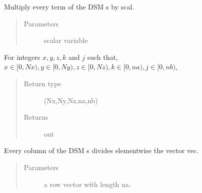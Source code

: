 \documentclass[letterpaper,10pt,english]{sphinxmanual}
\begin{document}
\begin{fulllineitems}

\begin{fulllineitems}
\label{\detokenize{index:DictionarySparseMatrix.DS.dict_scal_mult}}
Multiply every term of the DSM s by scal.
\begin{quote}\begin{description}
\item[{Parameters}] \leavevmode
{} \textendash{} scalar variable

\end{description}\end{quote}

For integers \(x,y,z,k\) and \(j\) such that,
\(x \in [0,Nx), y \in [0,Ny), z \in [0,Nz), k \in [0,na),j \in [0,nb)\),

\begin{sphinxVerbatim}[commandchars=\\\{\}]
\PYG{p}{[}\PYG{p}{]}\PYG{p}{[}\PYG{p}{]}
\end{sphinxVerbatim}
\begin{quote}\begin{description}
\item[{Return type}] \leavevmode
{\hyperref[\detokenize{index:DictionarySparseMatrix.DS}]{}}(Nx,Ny,Nz,na,nb)

\item[{Returns}] \leavevmode
out

\end{description}\end{quote}

\end{fulllineitems}


\begin{fulllineitems}
\label{\detokenize{index:DictionarySparseMatrix.DS.dict_vec_divideby_DSM}}
Every column of the DSM s divides elementwise the vector vec.
\begin{quote}\begin{description}
\item[{Parameters}] \leavevmode
{} \textendash{} a row vector with length na.


\end{description}
\end{quote}
\end{fulllineitems}
\end{fulllineitems}
\end{document}
